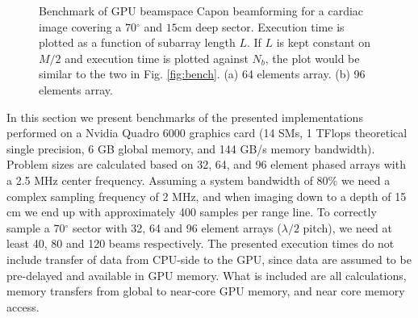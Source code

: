 \documentclass[12pt,journal,onecolumn]{IEEEtran}
\newcommand{\degree}{\ensuremath{^\circ}}
\begin{document}
\begin{figure}[!t]
\centerline{
\hfil
{}}
\caption{Benchmark of GPU beamspace Capon beamforming for a cardiac image covering a $70 \degree$ and $15$cm deep sector. Execution time is plotted as a function of subarray length $L$.  If $L$ is kept constant on $M/2$ and execution time is plotted against $N_b$, the plot would be similar to the two in Fig. \ref{fig:bench}. (a) 64 elements array. (b) 96 elements array.}
\label{fig:benchBS}
\end{figure}
In this section we present benchmarks of the presented implementations performed on a Nvidia Quadro 6000 graphics card (14 SMs, 1 TFlops theoretical single precision, 6 GB global memory, and 144 GB/s memory bandwidth). Problem sizes are calculated based on 32, 64, and 96 element phased arrays with a 2.5 MHz center frequency. Assuming a system bandwidth of 80\% we need a complex sampling frequency of 2 MHz, and when imaging down to a depth of 15 cm we end up with approximately 400 samples per range line. To correctly sample a $70\degree$ sector with 32, 64 and 96 element arrays ($\lambda/2$ pitch), we need at least 40, 80 and 120 beams respectively. The presented execution times do not include transfer of data from CPU-side to the GPU, since data are assumed to be pre-delayed and available in GPU memory. What is included are all calculations, memory transfers from global to near-core GPU memory, and near core memory access. 
\end{document}
